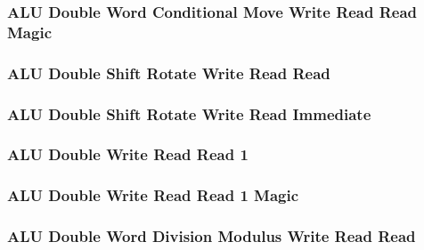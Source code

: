 \subsubsection[{\small ALU Double Word Conditional Move Write Read Read Magic}]{ALU Double Word Conditional Move Write Read Read Magic} \label{sec:format-ALU-DCMWRR.M}



\subsubsection[{\small ALU Double Shift Rotate Write Read Read}]{ALU Double Shift Rotate Write Read Read} \label{sec:format-ALU-DSWRR}



\subsubsection[{\small ALU Double Shift Rotate Write Read Immediate}]{ALU Double Shift Rotate Write Read Immediate} \label{sec:format-ALU-DSWRI}



\subsubsection[{\small ALU Double Write Read Read 1}]{ALU Double Write Read Read 1} \label{sec:format-ALU-DWRR1}



\subsubsection[{\small ALU Double Write Read Read 1 Magic}]{ALU Double Write Read Read 1 Magic} \label{sec:format-ALU-DWRR1.M}



\subsubsection[{\small ALU Double Word Division Modulus Write Read Read}]{ALU Double Word Division Modulus Write Read Read} \label{sec:format-ALU-DDMWRR}

